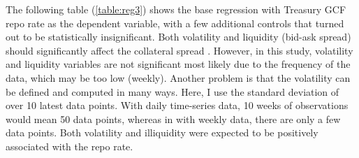 \documentclass[11pt,a4paper,english,oneside]{article}
\begin{document}
\begin{appendices}
The following table (\ref{table:reg3}) shows the base regression with Treasury GCF repo rate as the dependent variable, with a few additional controls that turned out to be statistically insignificant. Both volatility and liquidity (bid-ask spread) should significantly affect the collateral spread \citep{nyborg2019a}. However, in this study, volatility and liquidity variables are not significant most likely due to the frequency of the data, which may be too low (weekly). Another problem is that the volatility can be defined and computed in many ways. Here, I use the standard deviation of over 10 latest data points. With daily time-series data, 10 weeks of observations would mean 50 data points, whereas in with weekly data, there are only a few data points. Both volatility and illiquidity were expected to be positively associated with the repo rate.


\end{appendices}
\end{document}

